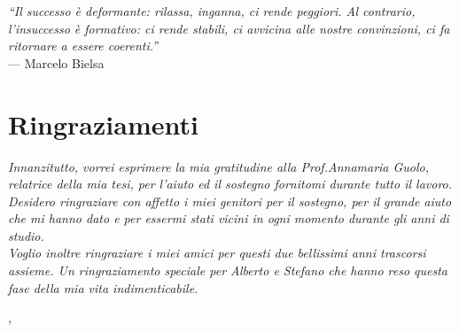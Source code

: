 
\cleardoublepage
{}
{}

\begin{flushright}{
	\slshape    
	``Il successo è deformante: rilassa, inganna, ci rende peggiori. Al contrario, l'insuccesso è formativo: ci rende stabili, ci avvicina alle nostre convinzioni, ci fa ritornare a essere coerenti.''} \\ 
	\medskip
   	--- Marcelo Bielsa %
\end{flushright}


\bigskip

\begingroup
\let\clearpage\relax
\let\cleardoublepage\relax
\let\cleardoublepage\relax

\chapter*{Ringraziamenti}

\noindent \textit{Innanzitutto, vorrei esprimere la mia gratitudine alla Prof.Annamaria Guolo, relatrice della mia tesi, per l'aiuto ed il sostegno fornitomi durante tutto il lavoro.}\\

\noindent \textit{Desidero ringraziare con affetto i miei genitori per il sostegno, per il grande aiuto che mi hanno dato e per essermi stati vicini in ogni momento durante gli anni di studio.}\\

\noindent \textit{Voglio inoltre ringraziare i miei amici per questi due bellissimi anni trascorsi assieme. Un ringraziamento speciale per Alberto e Stefano che hanno reso questa fase della mia vita indimenticabile.}\\

\bigskip

\noindent\textit{\myLocation, \myTime}
\hfill \myName

\endgroup

